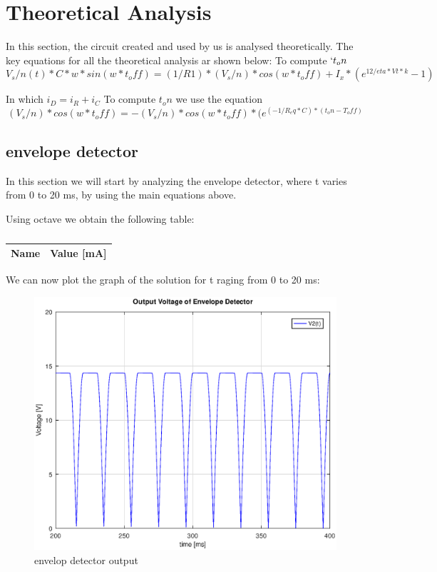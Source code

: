 \section{Theoretical Analysis}
\label{sec:analysis}

In this section, the circuit created and used by us is analysed
theoretically.
The key equations for all the theoretical analysis ar shown below:
To compute $`t_on$
\begin{equation}
	V_s/n(t)*C*w*sin(w*t_off) = (1/R1)*(V_s/n)*cos(w*t_off) +  I_x*(e^{12/eta*Vt*k} -1)
\end{equation}

In which $i_D = i_R + i_C$
To compute $t_on$ we use the equation
\begin{equation}
	(V_s/n)*cos(w*t_off) = -(V_s/n)*cos(w*t_off)*(e^{(-1/R_eq*C)*(t_on - T_off)}
\end{equation}


\subsection{envelope detector}
In this section we will start by analyzing the envelope detector, where t varies from 0 to 20 ms, by using the main equations above.

Using octave we obtain the following table:
\begin{table}[H]
	\centering
	\begin{tabular}{|l|r|}
		\hline    
		{\bf Name} & {\bf Value [mA]} \\ \hline
		
	\end{tabular}
	\caption{ }
	\label{tab:op}
\end{table}

We can now plot the graph of the solution for t raging from 0 to 20 ms:
\begin{figure}[H] \centering
\includegraphics[width=0.6\linewidth]{Output_Envelope_Detector.eps}
\caption{envelop detector output}
\label{fig:rc1}
\end{figure}
	
